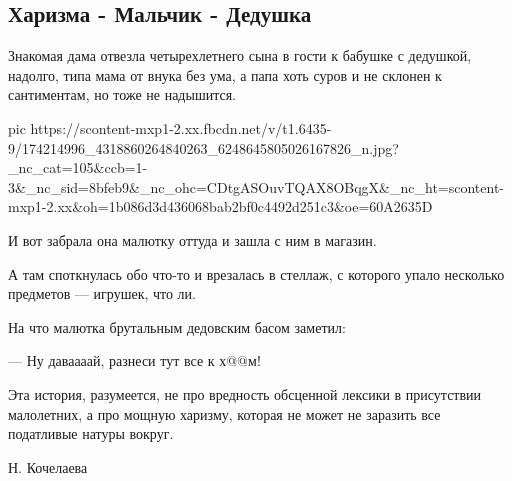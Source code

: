  
 
 
 
 
\subsection{Харизма - Мальчик - Дедушка}

Знакомая дама отвезла четырехлетнего сына в гости к бабушке с дедушкой,
надолго, типа мама от внука без ума, а папа хоть суров и не склонен к
сантиментам, но тоже не надышится.

\ifcmt
  pic https://scontent-mxp1-2.xx.fbcdn.net/v/t1.6435-9/174214996_4318860264840263_6248645805026167826_n.jpg?_nc_cat=105&ccb=1-3&_nc_sid=8bfeb9&_nc_ohc=CDtgASOuvTQAX8OBqgX&_nc_ht=scontent-mxp1-2.xx&oh=1b086d3d436068bab2bf0c4492d251c3&oe=60A2635D
\fi

И вот забрала она малютку оттуда и зашла с ним в магазин.

А там споткнулась обо что-то и врезалась в стеллаж, с которого упало несколько предметов — игрушек, что ли.

На что малютка брутальным дедовским басом заметил:

— Ну даваааай, разнеси тут все к х@@м!

Эта история, разумеется, не про вредность обсценной лексики в присутствии
малолетних, а про мощную харизму, которая не может не заразить все податливые
натуры вокруг.

Н. Кочелаева

